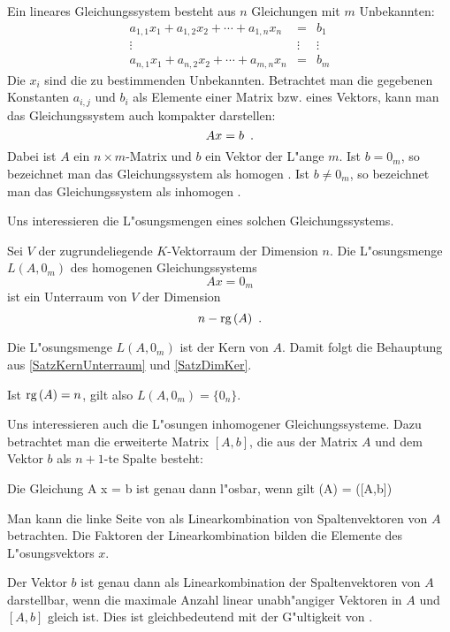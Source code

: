Ein lineares Gleichungssystem besteht aus $n$ Gleichungen mit $m$
Unbekannten:
\begin{eqnarray*}
    a_{1,1} x_1 + a_{1,2} x_2 + \cdots + a_{1,n} x_n & = & b_1 \\
    \vdots & \vdots & \vdots \\
    a_{n,1} x_1 + a_{n,2} x_2 + \cdots + a_{m,n} x_n & = & b_m
\end{eqnarray*}
Die $x_i$ sind die zu bestimmenden Unbekannten. Betrachtet man die
gegebenen Konstanten $a_{i,j}$ und $b_i$ als Elemente einer Matrix
bzw. eines Vektors, kann man das Gleichungssystem auch kompakter
darstellen:
\[ A x = b \mbox{\hspace{0.5em}.} \]
Dabei ist $A$ ein $n \times m$-Matrix und $b$ ein Vektor der L"ange $m$.
Ist $b= 0_m$, so bezeichnet man das Gleichungssystem als
homogen .
Ist $b \neq 0_m$, so bezeichnet man das Gleichungssystem als
inhomogen .

Uns interessieren die L"osungsmengen eines solchen Gleichungssystems.

\begin{satz}
\label{SatzLoesungsraum}
    Sei $V$ der zugrundeliegende $K$-Vektorraum der Dimension $n$.
    Die L"osungsmenge $L(A,0_m)$ des homogenen Gleichungssystems
    \[ A x = 0_m \] ist ein Unterraum von $V$ der Dimension
    \[ n - \mbox{\rm rg} \,(A) \mbox{\hspace{0.5em}.} \]
\end{satz}
\begin{beweis}
    Die L"osungsmenge $L(A,0_m)$ ist der Kern von $A$. Damit folgt
    die Behauptung aus \ref{SatzKernUnterraum} und
    \ref{SatzDimKer}.
\end{beweis}

Ist $\mbox{\rm rg} \,(A)=n$, gilt also $L(A,0_m) = \{ 0_n \}$.

Uns interessieren auch die L"osungen inhomogener Gleichungssysteme.
Dazu betrachtet man die erweiterte Matrix $[A,b]$, die aus der Matrix
$A$ und dem Vektor $b$ als $n+1$-te Spalte besteht:

\begin{satz}
\label{SatzRangGleich}
    Die Gleichung
        A x = b \MyPunkt
    \Eeq
    ist genau dann l"osbar, wenn gilt
        \rg(A) = \rg([A,b]) \MyPunkt
    \Eeq
\end{satz}
\begin{beweis}
    Man kann die linke Seite von  als 
    Linearkombination von Spaltenvektoren von $A$ betrachten. Die Faktoren 
    der Linearkombination bilden die Elemente des L"osungsvektors $x$.

    Der Vektor $b$ ist genau dann als Linearkombination der
    Spaltenvektoren von $A$ darstellbar, wenn die maximale Anzahl linear
    unabh"angiger Vektoren in $A$ und $[A,b]$ gleich ist. Dies ist
    gleichbedeutend mit der G"ultigkeit von .
\end{beweis}

